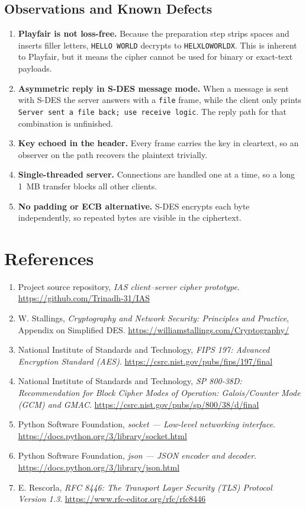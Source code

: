 \section{Observations and Known Defects}
\begin{enumerate}
  \item \textbf{Playfair is not loss-free.} Because the preparation step strips
        spaces and inserts filler letters, \texttt{HELLO WORLD} decrypts to
        \texttt{HELXLOWORLDX}. This is inherent to Playfair, but it means the
        cipher cannot be used for binary or exact-text payloads.
  \item \textbf{Asymmetric reply in S-DES message mode.} When a message is sent
        with S-DES the server answers with a \texttt{file} frame, while the client
        only prints \texttt{Server sent a file back; use receive logic}. The reply
        path for that combination is unfinished.
  \item \textbf{Key echoed in the header.} Every frame carries the key in
        cleartext, so an observer on the path recovers the plaintext trivially.
  \item \textbf{Single-threaded server.} Connections are handled one at a time, so
        a long 1~MB transfer blocks all other clients.
  \item \textbf{No padding or ECB alternative.} S-DES encrypts each byte
        independently, so repeated bytes are visible in the ciphertext.
\end{enumerate}

\chapter*{References}
\begin{enumerate}
  \item Project source repository, \emph{IAS client--server cipher prototype}.
        \url{https://github.com/Trinadh-31/IAS}
  \item W. Stallings, \emph{Cryptography and Network Security: Principles and
        Practice}, Appendix on Simplified DES. \url{https://williamstallings.com/Cryptography/}
  \item National Institute of Standards and Technology, \emph{FIPS 197: Advanced
        Encryption Standard (AES)}. \url{https://csrc.nist.gov/pubs/fips/197/final}
  \item National Institute of Standards and Technology, \emph{SP 800-38D:
        Recommendation for Block Cipher Modes of Operation: Galois/Counter Mode
        (GCM) and GMAC}. \url{https://csrc.nist.gov/pubs/sp/800/38/d/final}
  \item Python Software Foundation, \emph{socket --- Low-level networking
        interface}. \url{https://docs.python.org/3/library/socket.html}
  \item Python Software Foundation, \emph{json --- JSON encoder and decoder}.
        \url{https://docs.python.org/3/library/json.html}
  \item E. Rescorla, \emph{RFC 8446: The Transport Layer Security (TLS) Protocol
        Version 1.3}. \url{https://www.rfc-editor.org/rfc/rfc8446}
\end{enumerate}
